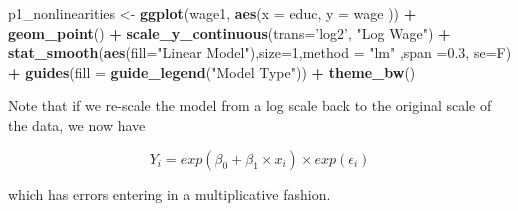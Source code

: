 \documentclass[]{book}
\newenvironment{Shaded}{\begin{snugshade}}{\end{snugshade}}
\newcommand{\CommentTok}[1]{\textcolor[rgb]{0.56,0.35,0.01}{\textit{#1}}}
\newcommand{\DataTypeTok}[1]{\textcolor[rgb]{0.13,0.29,0.53}{#1}}
\newcommand{\DecValTok}[1]{\textcolor[rgb]{0.00,0.00,0.81}{#1}}
\newcommand{\FloatTok}[1]{\textcolor[rgb]{0.00,0.00,0.81}{#1}}
\newcommand{\KeywordTok}[1]{\textcolor[rgb]{0.13,0.29,0.53}{\textbf{#1}}}
\newcommand{\NormalTok}[1]{#1}
\newcommand{\OperatorTok}[1]{\textcolor[rgb]{0.81,0.36,0.00}{\textbf{#1}}}
\newcommand{\StringTok}[1]{\textcolor[rgb]{0.31,0.60,0.02}{#1}}
\begin{document}
\begin{Shaded}
\begin{Highlighting}[]
\NormalTok{p1_nonlinearities <-}\StringTok{ }\KeywordTok{ggplot}\NormalTok{(wage1, }\KeywordTok{aes}\NormalTok{(}\DataTypeTok{x =}\NormalTok{ educ, }\DataTypeTok{y =}\NormalTok{ wage )) }\OperatorTok{+}
\StringTok{  }\KeywordTok{geom_point}\NormalTok{()   }\OperatorTok{+}\StringTok{ }
\StringTok{  }\KeywordTok{scale_y_continuous}\NormalTok{(}\DataTypeTok{trans=}\StringTok{'log2'}\NormalTok{, }\StringTok{"Log Wage"}\NormalTok{) }\OperatorTok{+}\StringTok{ }
\StringTok{  }\KeywordTok{stat_smooth}\NormalTok{(}\KeywordTok{aes}\NormalTok{(}\DataTypeTok{fill=}\StringTok{"Linear Model"}\NormalTok{),}\DataTypeTok{size=}\DecValTok{1}\NormalTok{,}\DataTypeTok{method =} \StringTok{"lm"}\NormalTok{ ,}\DataTypeTok{span =}\FloatTok{0.3}\NormalTok{, }\DataTypeTok{se=}\NormalTok{F) }\OperatorTok{+}\StringTok{ }
\StringTok{  }\KeywordTok{guides}\NormalTok{(}\DataTypeTok{fill =} \KeywordTok{guide_legend}\NormalTok{(}\StringTok{"Model Type"}\NormalTok{)) }\OperatorTok{+}\StringTok{ }
\StringTok{  }\KeywordTok{theme_bw}\NormalTok{()}
\end{Highlighting}
\end{Shaded}

Note that if we re-scale the model from a log scale back to the original
scale of the data, we now have

\begin{equation}
Y_{i} = exp(\beta_{0} + \beta_{1} \times x_{i})  \times exp(\epsilon_{i})
\end{equation}

which has errors entering in a multiplicative fashion.

\begin{Shaded}
\end{Shaded}
\end{document}
